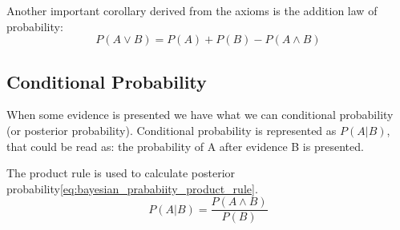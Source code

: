 Another important corollary derived from the axioms is the addition law of probability:
\begin{equation}
P(A\vee B)=P(A)+P(B) - P(A\wedge B)
\end{equation}

\subsection{Conditional Probability}
\label{subsubsec:conditionalprobability}
When some evidence is presented we have what we can conditional probability (or posterior probability). Conditional probability  is represented as $P(A|B)$, that could be read as: the probability of A after evidence B is presented. 

The product rule is used to calculate posterior probability\ref{eq:bayesian_prababiity_product_rule}.
\begin{equation}
\label{eq:bayesian_prababiity_product_rule}
P(A|B)=\frac{P(A\wedge B)}{P(B)}
\end{equation}


